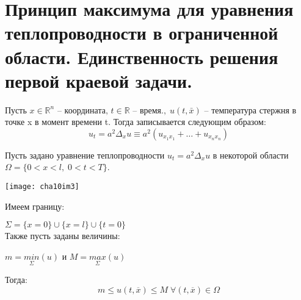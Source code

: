 \chapter{Принцип максимума для уравнения теплопроводности в ограниченной области. Единственность решения первой краевой задачи.}
\label{cha:10}

Пусть $x \in \mathbb{R}^n \text{ -- координата, } t \in \mathbb{R} \text{ -- время.}, \; u(t, \bar{x})$ -- температура стержня в точке x в момент времени t. Тогда  записывается следующим образом:
$$u_t = a^2 \Delta_x u \equiv a^2(u_{x_1x_1} + \ldots + u_{x_nx_n})$$

\begin{theorem}
	Пусть задано уравнение теплопроводности $u_t = a^2 \Delta_x u$ в некоторой области $\Omega = \lbrace 0 < x < l, \; 0 < t < T \rbrace$. 

	\begin{multicols}{2}
		\texttt{[image: cha10im3]} 

		\columnbreak

		Имеем границу: 

		$\Sigma = \lbrace x = 0 \rbrace \cup \lbrace x = l \rbrace \cup \lbrace t = 0 \rbrace$\\

		Также пусть заданы величины: 

		$m = \underset{\Sigma}{min}(u)$ и $M = \underset{\Sigma}{max}(u)$
	\end{multicols}
	
	Тогда:
	$$m \le u(t, \overline{x}) \le M \; \forall (t, \overline{x}) \in \Omega $$
\end{theorem}
